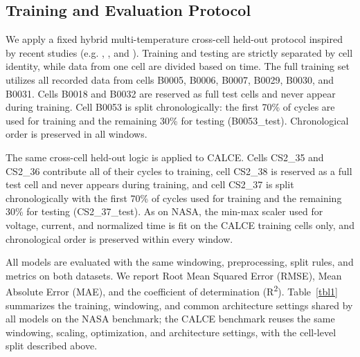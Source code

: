 \documentclass[a4paper,fleqn]{cas-sc}
\begin{document}
\subsection{Training and Evaluation Protocol}\label{sec:training}
We apply a fixed hybrid multi-temperature cross-cell held-out protocol inspired by recent studies (e.g. \citep{sahoo2022transfer}, \citep{che2023increasing}, and \citep{kumar2026temperature}).
Training and testing are strictly separated by cell identity, while data from one cell are divided based on time.
The full training set utilizes all recorded data from cells B0005, B0006, B0007, B0029, B0030, and B0031. Cells B0018 and B0032 are reserved as full test cells and never appear during training. Cell B0053 is split chronologically: the first 70\% of cycles are used for training and the remaining 30\% for testing (B0053\_test). Chronological order is preserved in all windows.

The same cross-cell held-out logic is applied to CALCE. Cells CS2\_35 and CS2\_36 contribute all of their cycles to training, cell CS2\_38 is reserved as a full test cell and never appears during training, and cell CS2\_37 is split chronologically with the first 70\% of cycles used for training and the remaining 30\% for testing (CS2\_37\_test). As on NASA, the min-max scaler used for voltage, current, and normalized time is fit on the CALCE training cells only, and chronological order is preserved within every window.

All models are evaluated with the same windowing, preprocessing, split rules, and metrics on both datasets. We report Root Mean Squared Error (RMSE), Mean Absolute Error (MAE), and the coefficient of determination (R\textsuperscript{2}). Table~\ref{tbl1} summarizes the training, windowing, and common architecture settings shared by all models on the NASA benchmark; the CALCE benchmark reuses the same windowing, scaling, optimization, and architecture settings, with the cell-level split described above.
\end{document}
